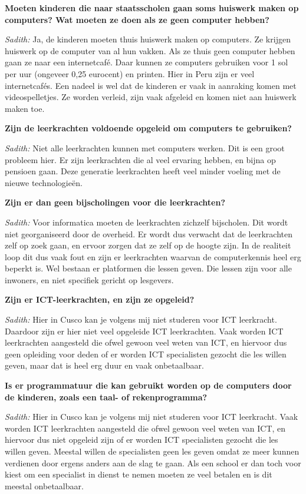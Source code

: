 \textbf{Moeten kinderen die naar staatsscholen gaan soms huiswerk maken op computers? Wat moeten ze doen als ze geen computer hebben?}

\textit{Sadith:} Ja, de kinderen moeten thuis huiswerk maken op computers. Ze krijgen huiswerk op de computer van al hun vakken. Als ze thuis geen computer hebben gaan ze naar een internetcafé. Daar kunnen ze computers gebruiken voor 1 sol per uur (ongeveer 0,25 eurocent) en printen. Hier in Peru zijn er veel internetcafés. Een nadeel is wel dat de kinderen er vaak in aanraking komen met videospelletjes. Ze worden verleid, zijn vaak afgeleid en komen niet aan huiswerk maken toe. 

\textbf{Zijn de leerkrachten voldoende opgeleid om computers te gebruiken?}

\textit{Sadith:} Niet alle leerkrachten kunnen met computers werken. Dit is een groot probleem hier. Er zijn leerkrachten die al veel ervaring hebben, en bijna op pensioen gaan. Deze generatie leerkrachten heeft veel minder voeling met de nieuwe technologieën.

\textbf{Zijn er dan geen bijscholingen voor die leerkrachten?}

\textit{Sadith:} Voor informatica moeten de leerkrachten zichzelf bijscholen. Dit wordt niet georganiseerd door de overheid. Er wordt dus verwacht dat de leerkrachten zelf op zoek gaan, en ervoor zorgen dat ze zelf op de hoogte zijn. In de realiteit loop dit dus vaak fout en zijn er leerkrachten waarvan de computerkennis heel erg beperkt is. Wel bestaan er platformen die lessen geven. Die lessen zijn voor alle inwoners, en niet specifiek gericht op lesgevers.

\textbf{Zijn er ICT-leerkrachten, en zijn ze opgeleid?}

\textit{Sadith:} Hier in Cusco kan je volgens mij niet studeren voor ICT leerkracht. Daardoor zijn er hier niet veel opgeleide ICT leerkrachten. Vaak worden ICT leerkrachten aangesteld die ofwel gewoon veel weten van ICT, en hiervoor dus geen opleiding voor deden of er worden ICT specialisten gezocht die les willen geven, maar dat is heel erg duur en vaak onbetaalbaar.

\textbf{Is er programmatuur die kan gebruikt worden op de computers door de kinderen, zoals een taal- of rekenprogramma?}

\textit{Sadith:} Hier in Cusco kan je volgens mij niet studeren voor ICT leerkracht. Vaak worden ICT leerkrachten aangesteld die ofwel gewoon veel weten van ICT, en hiervoor dus niet opgeleid zijn of er worden ICT specialisten gezocht die les willen geven. Meestal willen de specialisten geen les geven omdat ze meer kunnen verdienen door ergens anders aan de slag te gaan. Als een school er dan toch voor kiest om een specialist in dienst te nemen moeten ze veel betalen en is dit meestal onbetaalbaar.
	
